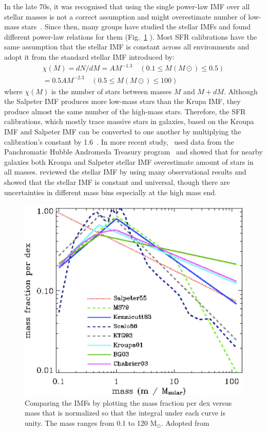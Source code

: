 In the late 70s, it was recognised that using the single power-law IMF over all stellar masses is not a correct assumption and might overestimate number of low-mass stars~\citep{Kroupa93, Bastin10}. 
Since then, many groups have studied the stellar IMFs and found different power-law relations for them (Fig.~\ref{fig: imf} ). 
Most SFR calibrations have the same assumption that the stellar IMF is constant across all environments and adopt it from the standard stellar IMF introduced by\cite{Kroupa01}:
\begin{align}
\chi (M) = dN/dM = A M^{-1.3}    \quad    (0.1 \le M(M{\odot}) \le 0.5)\\                  
           = 0.5 A M^{-2.3}    \quad    (0.5 \le M(M{\odot}) \le 100)
\end{align}
where $\chi(M)$ is the number of stars between masses $M$ and $M+dM$. 
Although the Salpeter IMF produces more low-mass stars than the Krupa IMF, they produce almost the same number of the high-mass stars. 
Therefore, the SFR calibrations, which mostly trace massive stars in galaxies, based on the Kroupa IMF and Salpeter IMF can be converted to one another by multiplying the calibration's constant by 1.6~\citep{Calzetti13}. 
In more recent study,~\cite{Weisz15} used data from the Panchromatic Hubble Andromeda Treasury program~\citep[PHAT][]{Dalcanton12} and showed that for nearby galaxies both Kroupa and Salpeter stellar IMF overestimate amount of stars in all masses.
\cite{Bastin10} reviewed the stellar IMF by using many observational results and showed that the stellar IMF is constant and universal, though there are uncertainties in different mass bins especially at the high mass end.


\begin{figure}
\label{fig: imf}
\centering
\includegraphics[width=16cm]{../image_intro/imf}
\small
\caption{Comparing the IMFs by plotting the mass fraction per dex versus mass that is normalized so that the integral under each curve is unity. The mass ranges from 0.1 to 120 M$_\odot$. Adopted from~\cite{Baldry03}}
\end{figure}


